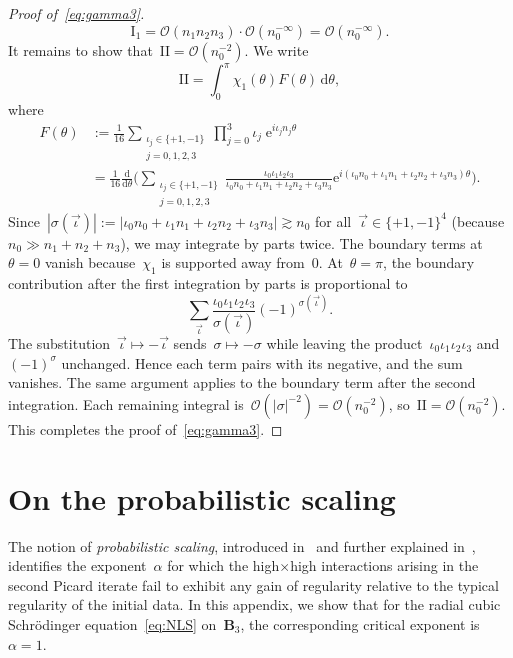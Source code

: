 \documentclass[11pt,reqno,english]{amsart}
\numberwithin{equation}{section}
\theoremstyle{plain}
\theoremstyle{definition}
\theoremstyle{remark}
\newcommand{\e}{\mathrm{e}}
\begin{document}
\begin{proof}[Proof of~\eqref{eq:gamma3}]
	\[
	\mathrm{I}_1 = \mathcal{O}(n_1n_2n_3)\cdot \mathcal{O}(n_0^{-\infty})=\mathcal{O}(n_0^{-\infty}).
	\]
It remains to show that~$\mathrm{II}=\mathcal{O}(n_0^{-2})$. We write
	\[
	\mathrm{II}=\int_0^{\pi}\chi_1(\theta)F(\theta)\,\mathrm{d}\theta,
	\]
	where
	\begin{align*}
		F(\theta)&:=\frac{1}{16}\sum_{\substack{\iota_j\in\{+1,-1\}\\j=0,1,2,3}}\prod_{j=0}^3\iota_j\;\e^{i\iota_jn_j\theta}\\
		&=\frac{1}{16}\frac{\mathrm{d}}{\mathrm{d}\theta}
		\Big(\sum_{\substack{\iota_j\in\{+1,-1\}\\j=0,1,2,3}}\frac{\iota_0\iota_1\iota_2\iota_3}{\iota_0n_0+\iota_1n_1+\iota_2n_2+\iota_3n_3}\e^{i(\iota_0n_0+\iota_1n_1+\iota_2n_2+\iota_3n_3)\theta}\Big).
	\end{align*}
	Since~$|\sigma(\vec\iota)| := |\iota_0 n_0 + \iota_1 n_1 + \iota_2 n_2 + \iota_3 n_3| \gtrsim n_0$ for all~$\vec\iota\in\{+1,-1\}^4$ (because~$n_0\gg n_1+n_2+n_3$), we may integrate by parts twice. The boundary terms at~$\theta=0$ vanish because~$\chi_1$ is supported away from~$0$. At~$\theta=\pi$, the boundary contribution after the first integration by parts is proportional to
	\[
	\sum_{\vec\iota}\frac{\iota_0\iota_1\iota_2\iota_3}{\sigma(\vec\iota)}(-1)^{\sigma(\vec\iota)}.
	\]
	The substitution~$\vec\iota\mapsto -\vec\iota$ sends~$\sigma\mapsto -\sigma$ while leaving the product~$\iota_0\iota_1\iota_2\iota_3$ and~$(-1)^{\sigma}$ unchanged. Hence each term pairs with its negative, and the sum vanishes. The same argument applies to the boundary term after the second integration. Each remaining integral is~$\mathcal{O}(|\sigma|^{-2}) = \mathcal{O}(n_0^{-2})$, so~$\mathrm{II}=\mathcal{O}(n_0^{-2})$. This completes the proof of~\eqref{eq:gamma3}.
\end{proof}


\section{On the probabilistic scaling}
\label{sec:scaling}

The notion of \emph{probabilistic scaling}, introduced in~\cite{DNY24,DNY22} and further explained in~\cite{DNYvietnam}, identifies the exponent~$\alpha$ for which the high$\times$high interactions arising in the second Picard iterate fail to exhibit any gain of regularity relative to the typical regularity of the initial data.
In this appendix, we show that for the radial cubic Schrödinger equation~\eqref{eq:NLS} on~$\mathbf{B}_{3}$, the corresponding critical exponent is~$\alpha=1$.
\end{document}
